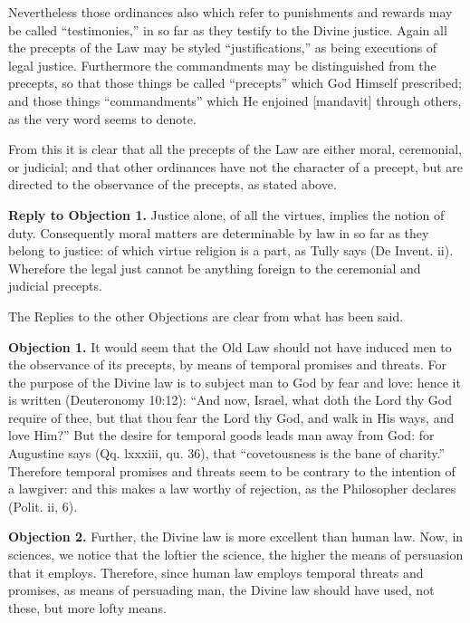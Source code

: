 Nevertheless those ordinances also which refer to punishments and rewards may be called ``testimonies,'' in so far as they testify to the Divine justice. Again all the precepts of the Law may be styled ``justifications,'' as being executions of legal justice. Furthermore the commandments may be distinguished from the precepts, so that those things be called ``precepts'' which God Himself prescribed; and those things ``commandments'' which He enjoined [mandavit] through others, as the very word seems to denote.

From this it is clear that all the precepts of the Law are either moral, ceremonial, or judicial; and that other ordinances have not the character of a precept, but are directed to the observance of the precepts, as stated above.

\textbf{Reply to Objection 1.} Justice alone, of all the virtues, implies the notion of duty. Consequently moral matters are determinable by law in so far as they belong to justice: of which virtue religion is a part, as Tully says (De Invent. ii). Wherefore the legal just cannot be anything foreign to the ceremonial and judicial precepts.

The Replies to the other Objections are clear from what has been said.


\textbf{Objection 1.} It would seem that the Old Law should not have induced men to the observance of its precepts, by means of temporal promises and threats. For the purpose of the Divine law is to subject man to God by fear and love: hence it is written (Deuteronomy 10:12): ``And now, Israel, what doth the Lord thy God require of thee, but that thou fear the Lord thy God, and walk in His ways, and love Him?'' But the desire for temporal goods leads man away from God: for Augustine says (Qq. lxxxiii, qu. 36), that ``covetousness is the bane of charity.'' Therefore temporal promises and threats seem to be contrary to the intention of a lawgiver: and this makes a law worthy of rejection, as the Philosopher declares (Polit. ii, 6).

\textbf{Objection 2.} Further, the Divine law is more excellent than human law. Now, in sciences, we notice that the loftier the science, the higher the means of persuasion that it employs. Therefore, since human law employs temporal threats and promises, as means of persuading man, the Divine law should have used, not these, but more lofty means.

